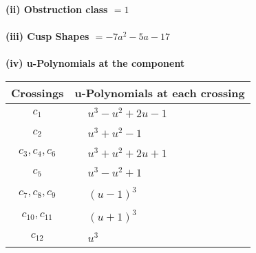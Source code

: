 \documentclass[1p]{elsarticle_modified}
\theoremstyle{definition}
\begin{document}
\flushleft \textbf{(ii) Obstruction class $= 1$}\\~\\
\flushleft \textbf{(iii) Cusp Shapes $= -7 a^2-5 a-17$}\\~\\
\newpage\renewcommand{\arraystretch}{1}
\flushleft \textbf{(iv) u-Polynomials at the component}\newline \\
\begin{tabular}{m{50pt}|m{274pt}}
Crossings & \hspace{64pt}u-Polynomials at each crossing \\
\hline $$\begin{aligned}c_{1}\end{aligned}$$&$\begin{aligned}
&u^3- u^2+2 u-1
\end{aligned}$\\
\hline $$\begin{aligned}c_{2}\end{aligned}$$&$\begin{aligned}
&u^3+u^2-1
\end{aligned}$\\
\hline $$\begin{aligned}c_{3},c_{4},c_{6}\end{aligned}$$&$\begin{aligned}
&u^3+u^2+2 u+1
\end{aligned}$\\
\hline $$\begin{aligned}c_{5}\end{aligned}$$&$\begin{aligned}
&u^3- u^2+1
\end{aligned}$\\
\hline $$\begin{aligned}c_{7},c_{8},c_{9}\end{aligned}$$&$\begin{aligned}
&(u-1)^3
\end{aligned}$\\
\hline $$\begin{aligned}c_{10},c_{11}\end{aligned}$$&$\begin{aligned}
&(u+1)^3
\end{aligned}$\\
\hline $$\begin{aligned}c_{12}\end{aligned}$$&$\begin{aligned}
&u^3
\end{aligned}$\\
\hline
\end{tabular}\\~\\
\end{document}
